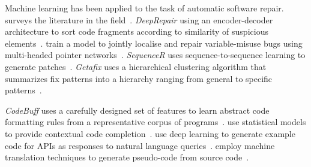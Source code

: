 Machine learning has been applied to the task of automatic software repair. \citeauthor{Monperrus2018} surveys the literature in the field~\cite{Monperrus2018}.
\emph{DeepRepair} using an encoder-decoder architecture to sort code fragments according to similarity of suspicious elements~\cite{White2019}.
\citeauthor{Vasic2019} train a model to jointly localise and repair variable-misuse bugs using multi-headed pointer networks~\cite{Vasic2019}.
\emph{SequenceR} uses sequence-to-sequence learning to generate patches~\cite{Chen2018}.
\emph{Getafix} uses a hierarchical clustering algorithm that summarizes fix patterns into a hierarchy ranging from general to specific patterns~\cite{Bader2019}.

\emph{CodeBuff} uses a carefully designed set of features to learn abstract code formatting rules from a representative corpus of programs~\cite{Terence2016}.
\citeauthor{Raychev2014} use statistical models to provide contextual code completion~\cite{Raychev2014}.
\citeauthor{Zhang2015a} use deep learning to generate example code for APIs as responses to natural language queries~\cite{Zhang2015a}.
\citeauthor{Oda2015} employ machine translation techniques to generate pseudo-code from source code~\cite{Oda2015}.
